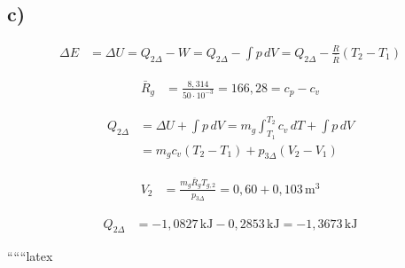 

\subsection*{c)}
\begin{align*}
\Delta E &= \Delta U = Q_{2\Delta} - W = Q_{2\Delta} - \int p \, dV = Q_{2\Delta} - \frac{R}{\bar{R}} (T_2 - T_1)
\end{align*}

\begin{align*}
\bar{R}_g &= \frac{8{,}314}{50 \cdot 10^{-3}} = 166{,}28 = c_p - c_v
\end{align*}

\begin{align*}
Q_{2\Delta} &= \Delta U + \int p \, dV = m_g \int_{T_1}^{T_2} c_v \, dT + \int p \, dV \\
&= m_g c_v (T_2 - T_1) + p_{3\Delta} (V_2 - V_1)
\end{align*}

\begin{align*}
V_2 &= \frac{m_g \bar{R}_g T_{g,2}}{p_{3\Delta}} = 0{,}60 + 0{,}103 \, \text{m}^3
\end{align*}

\begin{align*}
Q_{2\Delta} &= -1{,}0827 \, \text{kJ} - 0{,}2853 \, \text{kJ} = -1{,}3673 \, \text{kJ}
\end{align*}

``````latex